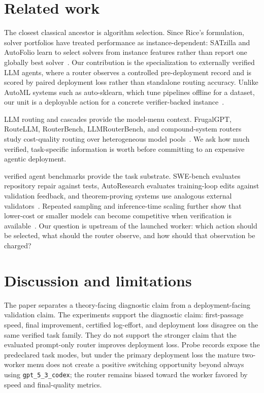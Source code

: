 \documentclass{article}
\newcounter{algorithm}
\begin{document}
\section{Related work}
\label{sec:related}

The closest classical ancestor is algorithm selection.
Since Rice's formulation, solver portfolios have treated performance as instance-dependent: SATzilla and AutoFolio learn to select solvers from instance features rather than report one globally best solver~\citep{rice1976algorithm,xu2012satzilla,lindauer2015autofolio,kotthoff2016algorithm}.
Our contribution is the specialization to externally verified LLM agents, where a router observes a controlled pre-deployment record and is scored by paired deployment loss rather than standalone routing accuracy.
Unlike AutoML systems such as auto-sklearn, which tune pipelines offline for a dataset, our unit is a deployable action for a concrete verifier-backed instance~\citep{feurer2015autosklearn}.

LLM routing and cascades provide the model-menu context.
FrugalGPT, RouteLLM, RouterBench, LLMRouterBench, and compound-system routers study cost-quality routing over heterogeneous model pools~\citep{chen2023frugalgpt,ong2024routellm,hu2024routerbench,anonymous2026llmrouterbench,chen2025optimizing,yue2025masrouter,zaharia2024compound}.
We ask how much verified, task-specific information is worth before committing to an expensive agentic deployment.

verified agent benchmarks provide the task substrate.
SWE-bench evaluates repository repair against tests, AutoResearch evaluates training-loop edits against validation feedback, and theorem-proving systems use analogous external validators~\citep{jimenez2024swebench,karpathy2026autoresearch}.
Repeated sampling and inference-time scaling further show that lower-cost or smaller models can become competitive when verification is available~\citep{brown2024monkeys,snell2025testtime,wu2025inference,osca2024}.
Our question is upstream of the launched worker: which action should be selected, what should the router observe, and how should that observation be charged?

\section{Discussion and limitations}
\label{sec:discussion}

The paper separates a theory-facing diagnostic claim from a deployment-facing validation claim.
The experiments support the diagnostic claim: first-passage speed, final improvement, certified log-effort, and deployment loss disagree on the same verified task family.
They do not support the stronger claim that the evaluated prompt-only router improves deployment loss.
Probe records expose the predeclared task modes, but under the primary deployment loss the mature two-worker menu does not create a positive switching opportunity beyond always using \texttt{gpt\_5\_3\_codex}; the router remains biased toward the worker favored by speed and final-quality metrics.
\end{document}
